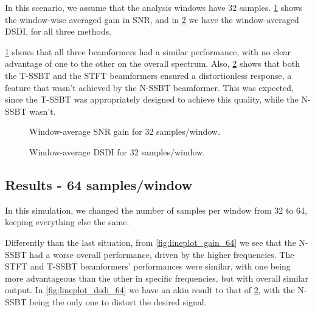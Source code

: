 In this scenario, we assume that the analysis windows have 32 samples. \cref{fig:lineplot_gain_32} shows the window-wise averaged gain in SNR, and in \cref{fig:lineplot_dsdi_32} we have the window-averaged DSDI, for all three methods.

\cref{fig:lineplot_gain_32} shows that all three beamformers had a similar performance, with no clear advantage of one to the other on the overall spectrum. Also, \cref{fig:lineplot_dsdi_32} shows that both the T-SSBT and the STFT beamformers ensured a distortionless response, a feature that wasn't achieved by the N-SSBT beamformer. This was expected, since the T-SSBT was appropriately designed to achieve this quality, while the N-SSBT wasn't.



%	
%	
%
\begin{figure}[H]
\centering

\caption{Window-average SNR gain for 32 samples/window.}
\label{fig:lineplot_gain_32}
\end{figure}

\begin{figure}[H]
	\centering
	
	\caption{Window-average DSDI for 32 samples/window.}
	\label{fig:lineplot_dsdi_32}
\end{figure}
%
\subsection{Results - 64 samples/window}

In this simulation, we changed the number of samples per window from 32 to 64, keeping everything else the same.

Differently than the last situation, from \cref{fig:lineplot_gain_64} we see that the N-SSBT had a worse overall performance, driven by the higher frequencies. The STFT and T-SSBT beamformers' performances were similar, with one being more advantageous than the other in specific frequencies, but with overall similar output. In \cref{fig:lineplot_dsdi_64} we have an akin result to that of \cref{fig:lineplot_dsdi_32}, with the N-SSBT being the only one to distort the desired signal.

